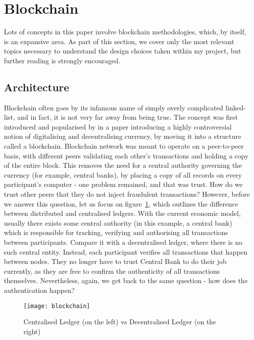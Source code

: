 \section{Blockchain}

Lots of concepts in this paper involve blockchain methodologies, which, by itself, is an expansive area. As part of this section, we cover only the most relevant topics necessary to understand the design choices taken within my project, but further reading is strongly encouraged.

\subsection{Architecture}
Blockchain often goes by its infamous name of simply overly complicated linked-list, and in fact, it is not very far away from being true. The concept was first introduced and popularised by \citet{nakamoto2008peer} in a paper introducing a highly controversial notion of digitalising and decentralising currency, by moving it into a structure called a blockchain. Blockchain network was meant to operate on a peer-to-peer basis, with different peers validating each other's transactions and holding a copy of the entire block. This removes the need for a central authority governing the currency (for example, central banks), by placing a copy of all records on every participant's computer - one problem remained, and that was trust. How do we trust other peers that they do not inject fraudulent transactions? However, before we answer this question, let us focus on figure~\ref{fig:blockchain}, which outlines the difference between distributed and centralised ledgers. With the current economic model, usually there exists some central authority (in this example, a central bank) which is responsible for tracking, verifying and authorising all transactions between participants. Compare it with a decentralised ledger, where there is no such central entity. Instead, each participant verifies all transactions that happen between nodes. They no longer have to trust Central Bank to do their job currently, as they are free to confirm the authenticity of all transactions themselves. Nevertheless, again, we get back to the same question - how does the authentication happen?

\begin{figure}[ht]
    \centering
    \texttt{[image: blockchain]}
    \caption{Centralised Ledger (on the left) vs Decentralised Ledger (on the right)}
    \label{fig:blockchain}
\end{figure}

